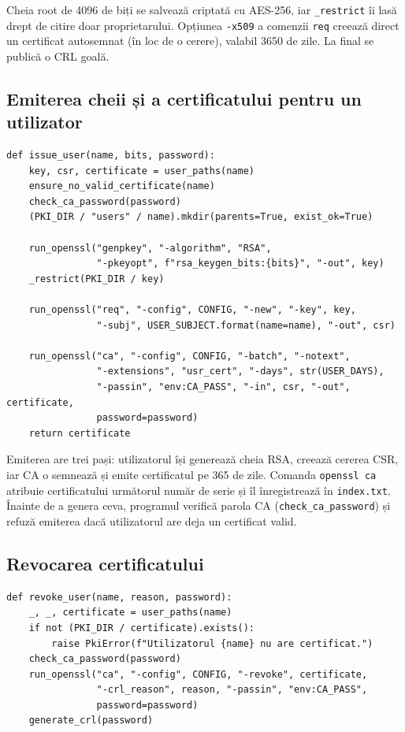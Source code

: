 \documentclass[12pt,a4paper]{article}
\begin{document}
Cheia root de 4096 de biți se salvează criptată cu AES-256, iar
\texttt{\_restrict} îi lasă drept de citire doar proprietarului. Opțiunea
\texttt{-x509} a comenzii \texttt{req} creează direct un certificat autosemnat
(în loc de o cerere), valabil 3650 de zile. La final se publică o CRL goală.

\subsection{Emiterea cheii și a certificatului pentru un utilizator}

\begin{lstlisting}[caption={Funcția \texttt{issue\_user}}]
def issue_user(name, bits, password):
    key, csr, certificate = user_paths(name)
    ensure_no_valid_certificate(name)
    check_ca_password(password)
    (PKI_DIR / "users" / name).mkdir(parents=True, exist_ok=True)

    run_openssl("genpkey", "-algorithm", "RSA",
                "-pkeyopt", f"rsa_keygen_bits:{bits}", "-out", key)
    _restrict(PKI_DIR / key)

    run_openssl("req", "-config", CONFIG, "-new", "-key", key,
                "-subj", USER_SUBJECT.format(name=name), "-out", csr)

    run_openssl("ca", "-config", CONFIG, "-batch", "-notext",
                "-extensions", "usr_cert", "-days", str(USER_DAYS),
                "-passin", "env:CA_PASS", "-in", csr, "-out", certificate,
                password=password)
    return certificate
\end{lstlisting}

Emiterea are trei pași: utilizatorul își generează cheia RSA, creează cererea
CSR, iar CA o semnează și emite certificatul pe 365 de zile. Comanda
\texttt{openssl ca} atribuie certificatului următorul număr de serie și îl
înregistrează în \texttt{index.txt}. Înainte de a genera ceva, programul
verifică parola CA (\texttt{check\_ca\_password}) și refuză emiterea dacă
utilizatorul are deja un certificat valid.

\subsection{Revocarea certificatului}

\begin{lstlisting}[caption={Funcția \texttt{revoke\_user}}]
def revoke_user(name, reason, password):
    _, _, certificate = user_paths(name)
    if not (PKI_DIR / certificate).exists():
        raise PkiError(f"Utilizatorul {name} nu are certificat.")
    check_ca_password(password)
    run_openssl("ca", "-config", CONFIG, "-revoke", certificate,
                "-crl_reason", reason, "-passin", "env:CA_PASS",
                password=password)
    generate_crl(password)
\end{lstlisting}
\end{document}
